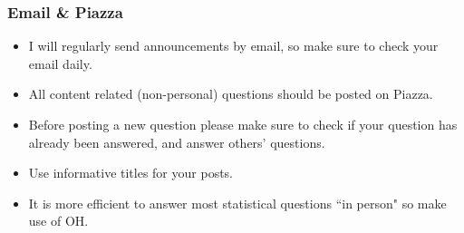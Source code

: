 \documentclass[slidestop,compress,mathserif,12pt,t,professionalfonts,xcolor=table]{beamer}
\begin{document}
\begin{frame}
\frametitle{Email \& Piazza}

\begin{itemize}

\item I will regularly send announcements by email, so make sure to check your email  
daily.

\item All content related (non-personal) questions should be posted on Piazza.

\item Before posting a new question please make sure to check if your question has 
already been answered, and answer others' questions.

\item Use informative titles for your posts.

\item It is more efficient to answer most statistical questions ``in person" so make 
use of OH.

\end{itemize}


\end{frame}

\end{document}
